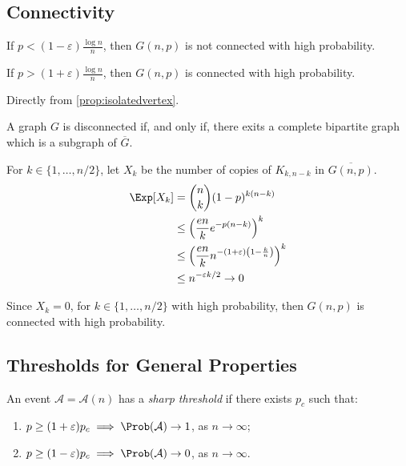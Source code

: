 \subsection{Connectivity}

\begin{thm}
	If $p < (1-\varepsilon)\frac{\log{n}}{n}$, then $G(n, p)$ is not connected with high probability.

	If $p > (1+\varepsilon)\frac{\log{n}}{n}$, then $G(n, p)$ is connected with high probability.
\end{thm}
\begin{dem}
	Directly from \cref{prop:isolatedvertex}.
\end{dem}
\begin{dem}
	A graph $G$ is disconnected if, and only if, there exits a complete bipartite graph which is a subgraph of $\overline G$. 

	For $k \in \{1, \dots, n/2\}$, let $X_k$ be the number of copies of $K_{k, n-k}$ in $\overline{G(n,p)}$.
	\begin{align*}
		\Exp[X_k] &= \binom{n}{k}(1-p)^{k(n-k)} \\
				  &\le \left(\frac{en}{k}e^{-p(n-k)}\right)^k \\
				  &\le \left(\frac{en}{k}n^{-\left(1+\varepsilon\right)\left(1-\frac{k}{n}\right)}\right)^k\\
				  &\le n^{-\varepsilon k /2} \to 0
	\end{align*}

	Since $X_k = 0$, for $k \in \{1, \dots, n/2\}$ with high probability, then $G(n,p)$ is connected with high probability.
\end{dem}

\subsection{Thresholds for General Properties}

\begin{defn}
	An event $\mathcal A = \mathcal A(n)$ has a \emph{sharp threshold} if there exists $p_c$ such that:
	\begin{enumerate}[label = \textbullet] 
		\item $p \ge (1+\varepsilon)p_c \implies \Prob(\mathcal A) \to 1$, as  $n \to \infty$;
		\item $p \ge (1-\varepsilon)p_c \implies \Prob(\mathcal A) \to 0$, as  $n \to \infty$.
	\end{enumerate}
\end{defn}


